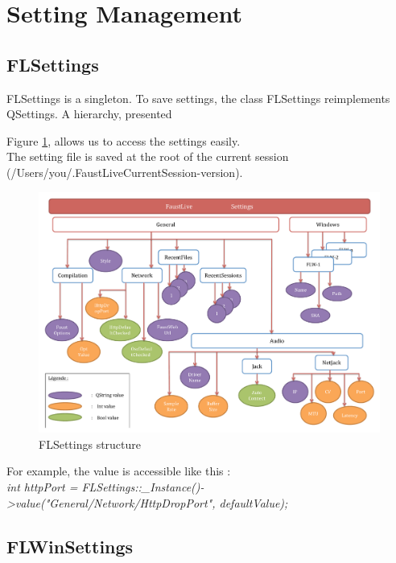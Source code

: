 \documentclass[a4paper]{article}
\begin{document}
\section{Setting Management}

\subsection{FLSettings}

FLSettings is a singleton. 
To save settings, the class FLSettings reimplements QSettings. A hierarchy, presented {Figure \ref{fig:FLSettings}, allows us to access the settings easily. \\

The setting file is saved at the root of the current session (/Users/you/.FaustLiveCurrentSession-version).
 
\begin{figure}[!h]
\begin{center}
\includegraphics[width=\columnwidth]{images/FLSettings}
\caption{FLSettings structure}
\label{fig:FLSettings}
\end{center}
\end{figure}
 
For example, the value is accessible like this :\\
\textit{int httpPort = FLSettings::\_Instance()->value("General/Network/HttpDropPort", defaultValue);}

\subsection{FLWinSettings}

}
\end{document}
